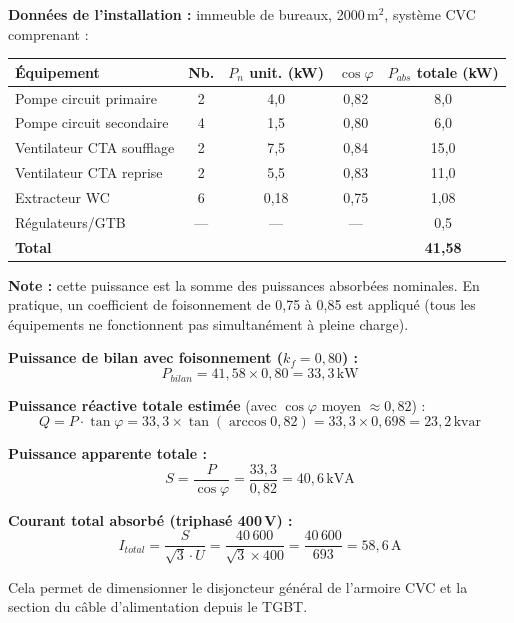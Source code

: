 \begin{exemple}[title={Bilan de puissance électrique d'une installation CVC complète}]
  \textbf{Données de l'installation :} immeuble de bureaux, 2000\,m$^2$, système CVC comprenant :

  \begin{center}
    \begin{tabular}{lcccc}
      \toprule
      Équipement & Nb. & $P_n$ unit. (kW) & $\cos\varphi$ & $P_{abs}$ totale (kW) \\
      \midrule
      Pompe circuit primaire & 2 & 4{,}0 & 0{,}82 & 8{,}0 \\
      Pompe circuit secondaire & 4 & 1{,}5 & 0{,}80 & 6{,}0 \\
      Ventilateur CTA soufflage & 2 & 7{,}5 & 0{,}84 & 15{,}0 \\
      Ventilateur CTA reprise & 2 & 5{,}5 & 0{,}83 & 11{,}0 \\
      Extracteur WC & 6 & 0{,}18 & 0{,}75 & 1{,}08 \\
      Régulateurs/GTB & — & — & — & 0{,}5 \\
      \midrule
      \textbf{Total} & & & & \textbf{41{,}58} \\
      \bottomrule
    \end{tabular}
  \end{center}

  \textbf{Note :} cette puissance est la somme des puissances absorbées nominales. En pratique, un coefficient de foisonnement de 0,75 à 0,85 est appliqué (tous les équipements ne fonctionnent pas simultanément à pleine charge).

  \textbf{Puissance de bilan avec foisonnement ($k_f = 0{,}80$) :}
  \[
    P_{bilan} = 41{,}58 \times 0{,}80 = 33{,}3\,\text{kW}
  \]

  \textbf{Puissance réactive totale estimée} (avec $\cos\varphi$ moyen $\approx 0{,}82$) :
  \[
    Q = P \cdot \tan\varphi = 33{,}3 \times \tan(\arccos 0{,}82) = 33{,}3 \times 0{,}698 = 23{,}2\,\text{kvar}
  \]

  \textbf{Puissance apparente totale :}
  \[
    S = \frac{P}{\cos\varphi} = \frac{33{,}3}{0{,}82} = 40{,}6\,\text{kVA}
  \]

  \textbf{Courant total absorbé (triphasé 400\,V) :}
  \[
    I_{total} = \frac{S}{\sqrt{3} \cdot U} = \frac{40\,600}{\sqrt{3} \times 400} = \frac{40\,600}{693} = 58{,}6\,\text{A}
  \]

  Cela permet de dimensionner le disjoncteur général de l'armoire CVC et la section du câble d'alimentation depuis le TGBT.
\end{exemple}

